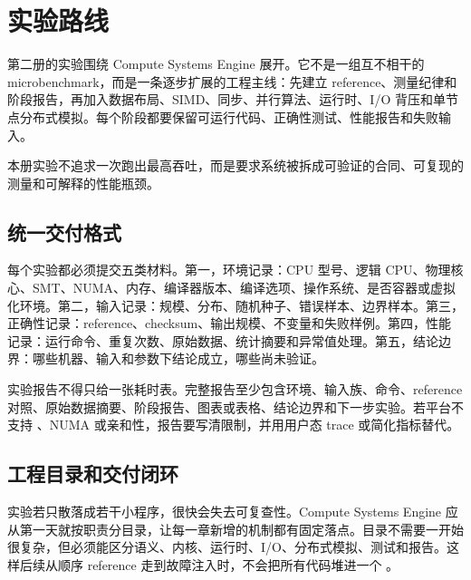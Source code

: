 \chapter{实验路线}

第二册的实验围绕 Compute Systems Engine 展开。它不是一组互不相干的 microbenchmark，而是一条逐步扩展的工程主线：先建立 reference、测量纪律和阶段报告，再加入数据布局、SIMD、同步、并行算法、运行时、I/O 背压和单节点分布式模拟。每个阶段都要保留可运行代码、正确性测试、性能报告和失败输入。

\begin{keyidea}
本册实验不追求一次跑出最高吞吐，而是要求系统被拆成可验证的合同、可复现的测量和可解释的性能瓶颈。
\end{keyidea}

\section{统一交付格式}

每个实验都必须提交五类材料。第一，环境记录：CPU 型号、逻辑 CPU、物理核心、SMT、NUMA、内存、编译器版本、编译选项、操作系统、是否容器或虚拟化环境。第二，输入记录：规模、分布、随机种子、错误样本、边界样本。第三，正确性记录：reference、checksum、输出规模、不变量和失败样例。第四，性能记录：运行命令、重复次数、原始数据、统计摘要和异常值处理。第五，结论边界：哪些机器、输入和参数下结论成立，哪些尚未验证。

\begin{rubricbox}
实验报告不得只给一张耗时表。完整报告至少包含环境、输入族、命令、reference 对照、原始数据摘要、阶段报告、图表或表格、结论边界和下一步实验。若平台不支持 、NUMA 或亲和性，报告要写清限制，并用用户态 trace 或简化指标替代。
\end{rubricbox}

\section{工程目录和交付闭环}

实验若只散落成若干小程序，很快会失去可复查性。Compute Systems Engine 应从第一天就按职责分目录，让每一章新增的机制都有固定落点。目录不需要一开始很复杂，但必须能区分语义、内核、运行时、I/O、分布式模拟、测试和报告。这样后续从顺序 reference 走到故障注入时，不会把所有代码堆进一个 。

